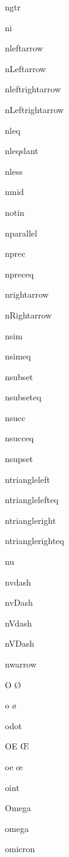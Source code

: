 \documentclass{article}
\begin{document}
ngtr    \ngtr{}

ni    \ni{}

nleftarrow    \nleftarrow{}

nLeftarrow    \nLeftarrow{}

nleftrightarrow    \nleftrightarrow{}

nLeftrightarrow    \nLeftrightarrow{}

nleq    \nleq{}

nleqslant    \nleqslant{}

nless    \nless{}

nmid    \nmid{}

notin    \notin{}

nparallel    \nparallel{}

nprec    \nprec{}

npreceq    \npreceq{}

nrightarrow    \nrightarrow{}

nRightarrow    \nRightarrow{}

nsim    \nsim{}

nsimeq    \nsimeq{}

nsubset    \nsubset{}

nsubseteq    \nsubseteq{}

nsucc    \nsucc{}

nsucceq    \nsucceq{}

nsupset    \nsupset{}

ntriangleleft    \ntriangleleft{}

ntrianglelefteq    \ntrianglelefteq{}

ntriangleright    \ntriangleright{}

ntrianglerighteq    \ntrianglerighteq{}

nu    \nu{}

nvdash    \nvdash{}

nvDash    \nvDash{}

nVdash    \nVdash{}

nVDash    \nVDash{}

nwarrow    \nwarrow{}


O    \O{}

o    \o{}

odot    \odot{}

OE    \OE{}

oe    \oe{}

oint    \oint{}

Omega    \Omega{}

omega    \omega{}

omicron    \omicron{}
\end{document}
